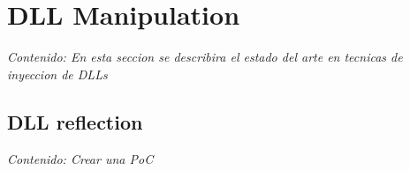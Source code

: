 \section{DLL Manipulation}

\textit{Contenido: En esta seccion se describira el estado del arte en tecnicas de
inyeccion de DLLs}
\vspace{1em}

\subsection{DLL reflection}

\textit{Contenido: Crear una PoC}
